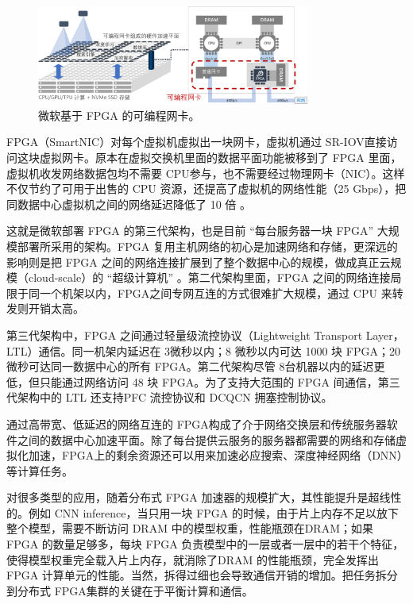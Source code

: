 \begin{figure}[htbp]
	\centering
	\includegraphics[width=0.8\textwidth]{figures/azure_fpga.pdf}
	\caption{微软基于 FPGA 的可编程网卡。}
	\label{background:fig:azure_fpga}
\end{figure}


FPGA（SmartNIC）对每个虚拟机虚拟出一块网卡，虚拟机通过 SR-IOV直接访问这块虚拟网卡。原本在虚拟交换机里面的数据平面功能被移到了 FPGA 里面，虚拟机收发网络数据包均不需要 CPU参与，也不需要经过物理网卡（NIC）。这样不仅节约了可用于出售的 CPU 资源，还提高了虚拟机的网络性能（25 Gbps），把同数据中心虚拟机之间的网络延迟降低了 10 倍 \cite{smartnic}。

这就是微软部署 FPGA 的第三代架构，也是目前 ``每台服务器一块 FPGA'' 大规模部署所采用的架构。FPGA 复用主机网络的初心是加速网络和存储，更深远的影响则是把 FPGA 之间的网络连接扩展到了整个数据中心的规模，做成真正云规模（cloud-scale）的 ``超级计算机'' \cite{configurable-cloud-acceleration}。第二代架构里面，FPGA 之间的网络连接局限于同一个机架以内，FPGA之间专网互连的方式很难扩大规模，通过 CPU 来转发则开销太高。

第三代架构中，FPGA 之间通过轻量级流控协议（Lightweight Transport Layer，LTL）通信。同一机架内延迟在 3微秒以内；8 微秒以内可达 1000 块 FPGA；20 微秒可达同一数据中心的所有 FPGA。第二代架构尽管 8台机器以内的延迟更低，但只能通过网络访问 48 块 FPGA。为了支持大范围的 FPGA 间通信，第三代架构中的 LTL 还支持PFC 流控协议和 DCQCN 拥塞控制协议。

通过高带宽、低延迟的网络互连的 FPGA构成了介于网络交换层和传统服务器软件之间的数据中心加速平面。除了每台提供云服务的服务器都需要的网络和存储虚拟化加速，FPGA上的剩余资源还可以用来加速必应搜索、深度神经网络（DNN）等计算任务。

对很多类型的应用，随着分布式 FPGA 加速器的规模扩大，其性能提升是超线性的。例如 CNN inference，当只用一块 FPGA 的时候，由于片上内存不足以放下整个模型，需要不断访问 DRAM 中的模型权重，性能瓶颈在DRAM；如果 FPGA 的数量足够多，每块 FPGA 负责模型中的一层或者一层中的若干个特征，使得模型权重完全载入片上内存，就消除了DRAM 的性能瓶颈，完全发挥出 FPGA 计算单元的性能。当然，拆得过细也会导致通信开销的增加。把任务拆分到分布式 FPGA集群的关键在于平衡计算和通信。


